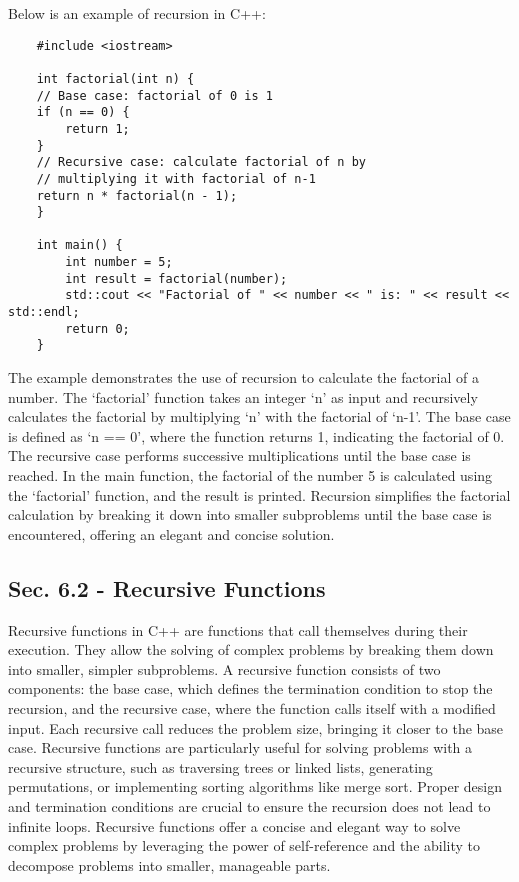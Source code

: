 \begin{solution}
    Below is an example of recursion in C++:

    \horizontalline

    \begin{verbatim}
    #include <iostream>

    int factorial(int n) {
    // Base case: factorial of 0 is 1
    if (n == 0) {
        return 1;
    }
    // Recursive case: calculate factorial of n by 
    // multiplying it with factorial of n-1
    return n * factorial(n - 1);
    }

    int main() {
        int number = 5;
        int result = factorial(number);
        std::cout << "Factorial of " << number << " is: " << result << std::endl;
        return 0;
    }
    \end{verbatim}

    \horizontalline

    The example demonstrates the use of recursion to calculate the factorial of a number. The `factorial' function takes an integer `n' as input and recursively calculates the factorial by multiplying `n' with the factorial of `n-1'. The base case is defined as 
    `n == 0', where the function returns 1, indicating the factorial of 0. The recursive case performs successive multiplications until the base case is reached. In the main function, the factorial of the number 5 is calculated using the `factorial' function, and 
    the result is printed. Recursion simplifies the factorial calculation by breaking it down into smaller subproblems until the base case is encountered, offering an elegant and concise solution.
\end{solution}

\subsection*{Sec. 6.2 - Recursive Functions}

Recursive functions in C++ are functions that call themselves during their execution. They allow the solving of complex problems by breaking them down into smaller, simpler subproblems. A recursive function consists of two components: the base case, which defines the 
termination condition to stop the recursion, and the recursive case, where the function calls itself with a modified input. Each recursive call reduces the problem size, bringing it closer to the base case. Recursive functions are particularly useful for solving problems 
with a recursive structure, such as traversing trees or linked lists, generating permutations, or implementing sorting algorithms like merge sort. Proper design and termination conditions are crucial to ensure the recursion does not lead to infinite loops. Recursive functions 
offer a concise and elegant way to solve complex problems by leveraging the power of self-reference and the ability to decompose problems into smaller, manageable parts.

